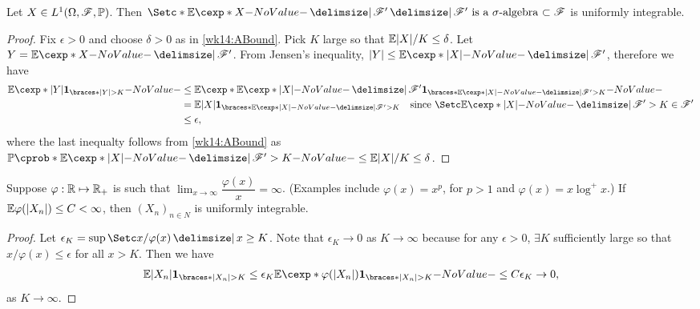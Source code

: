 \documentclass[12pt]{article}
\begin{document}
\begin{Proposition}
Let $X \in L^1(\Omega,\scF,\P)$. Then $\set*{\E[X]{\scF'} \given \text{$\scF'$ is a $\sigma$-algebra $\subset \scF$}}$ is uniformly integrable. 
\end{Proposition}
\begin{proof}
Fix $\epsilon>0$ and choose $\delta>0$ as in \cref{wk14:ABound}. Pick $K$ large so that $\E|X|/K \leq \delta$. Let $Y=\E[X]{\scF'}$. From Jensen's inequality, $|Y| \leq \E[|X|]{\scF'}$, therefore we have
\begin{align*}
\E[|Y|\indicator{|Y|>K}] 
&\leq \E[ \E[|X|]{\scF'} \indicator{\E[|X|]{\scF'} > K}] \\
&= \E|X|\indicator{\E[|X|]{\scF'} > K}\quad \text{since $\set{\E[|X|]{\scF'} > K} \in \scF'$} \\
&\leq \epsilon,
\end{align*}
where the last inequalty follows from \cref{wk14:ABound} as $\P(\E[|X|]{\scF'} > K) \leq \E|X|/K \leq \delta$.
\end{proof}

\begin{Proposition}
Suppose $\varphi : \mathbb{R}\mapsto\mathbb{R}_+$ is such that $\lim_{x\to\infty} \dfrac{\varphi(x)}{x} = \infty$. (Examples include $\varphi(x)=x^p$, for $p>1$ and $\varphi(x)=x\log^{+}x$.) If $\E\varphi(|X_n|) \leq C <\infty$, then $(X_n)_{n\in N}$ is uniformly integrable.
\end{Proposition}
\begin{proof}
Let $\epsilon_K = \sup\set{x/\varphi(x)\given x\geq K}$. Note that $\epsilon_K\to 0$ as $K\to\infty$ because for any $\epsilon>0$, $\exists K$ sufficiently large so that $x/\varphi(x) \leq \epsilon$ for all $x>K$. Then we have
\begin{align*}
\E|X_n|\indicator{|X_n|>K} \leq \epsilon_{K} \E[\varphi(|X_n|)\indicator{|X_n|>K}] \leq C\epsilon_K \to 0,
\end{align*}
as $K\to\infty$.
\end{proof}
\end{document}
